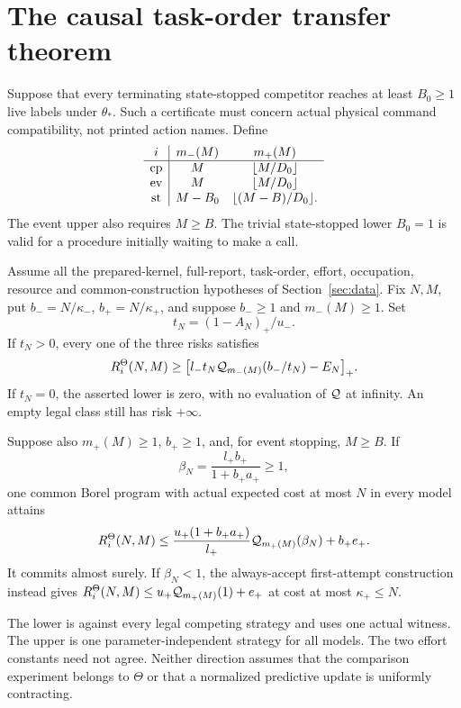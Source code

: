 \section{The causal task-order transfer theorem}\label{sec:central}
Suppose that every terminating state-stopped competitor reaches at least $B_0\ge1$ live labels under $\theta_*$. Such a certificate must concern actual physical command compatibility, not printed action names. Define
\begin{equation}\label{eq:widths}
\begin{array}{c|cc}
 i&m_-(M)&m_+(M)\\\hline
 \mathrm{cp}&M&\lfloor M/D_0\rfloor\\
 \mathrm{ev}&M&\lfloor M/D_0\rfloor\\
 \mathrm{st}&M-B_0&\lfloor(M-B)/D_0\rfloor .
\end{array}
\end{equation}
The event upper also requires $M\ge B$. The trivial state-stopped lower $B_0=1$ is valid for a procedure initially waiting to make a call.

\begin{theorem}\label{thm:transfer}
Assume all the prepared-kernel, full-report, task-order, effort, occupation, resource and common-construction hypotheses of Section~\ref{sec:data}. Fix $N,M$, put $b_-=N/\kappa_-$, $b_+=N/\kappa_+$, and suppose $b_-\ge1$ and $m_-(M)\ge1$. Set
\[
 t_N=(1-A_N)_+/u_-.
\]
If $t_N>0$, every one of the three risks satisfies
\begin{equation}\label{eq:central-lower}
 R_i^\Theta(N,M)\ge
 \bigl[l_-t_N\mathcal Q_{m_-(M)}(b_-/t_N)-E_N\bigr]_+.
\end{equation}
If $t_N=0$, the asserted lower is zero, with no evaluation of $\mathcal Q$ at infinity. An empty legal class still has risk $+\infty$.

Suppose also $m_+(M)\ge1$, $b_+\ge1$, and, for event stopping, $M\ge B$. If
\begin{equation}\label{eq:beta}
 \beta_N=\frac{l_+b_+}{1+b_+a_+}\ge1,
\end{equation}
one common Borel program with actual expected cost at most $N$ in every model attains
\begin{equation}\label{eq:central-upper}
 R_i^\Theta(N,M)\le
 \frac{u_+(1+b_+a_+)}{l_+}\mathcal Q_{m_+(M)}(\beta_N)+b_+e_+.
\end{equation}
It commits almost surely. If $\beta_N<1$, the always-accept first-attempt construction instead gives $R_i^\Theta(N,M)\le u_+\mathcal Q_{m_+(M)}(1)+e_+$ at cost at most $\kappa_+\le N$.

The lower is against every legal competing strategy and uses one actual witness. The upper is one parameter-independent strategy for all models. The two effort constants need not agree. Neither direction assumes that the comparison experiment belongs to $\Theta$ or that a normalized predictive update is uniformly contracting.
\end{theorem}

